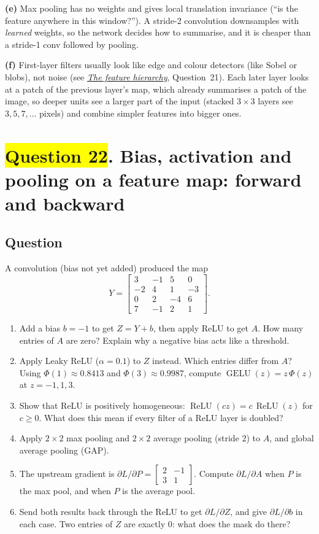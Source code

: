 \documentclass[12pt,a4paper]{article}
\newcommand{\seeconcept}[3]{(see \hyperref[#1]{\textit{#2}}, Question~#3)}
\newcommand{\relu}{\operatorname{ReLU}}
\newcommand{\hlq}[1]{{\setlength{\fboxsep}{1.5pt}\colorbox{yellow}{#1}}}
\begin{document}
\textbf{(e)} Max pooling has no weights and gives local translation invariance (``is the feature anywhere in this window?''). A stride-2 convolution downsamples with \emph{learned} weights, so the network decides how to summarise, and it is cheaper than a stride-1 conv followed by pooling.

\textbf{(f)} First-layer filters usually look like edge and colour detectors (like Sobel or blobs), not noise \seeconcept{c:hierarchy}{The feature hierarchy}{21}. Each later layer looks at a patch of the previous layer's map, which already summarises a patch of the image, so deeper units see a larger part of the input (stacked $3\times3$ layers see $3,5,7,\dots$ pixels) and combine simpler features into bigger ones.
\section[Question 22. Bias, activation and pooling on a feature map: forward and backward]{\hlq{Question 22}. Bias, activation and pooling on a feature map: forward and backward}
\subsection*{Question}
A convolution (bias not yet added) produced the map
\[
Y=\begin{bmatrix}3&-1&5&0\\-2&4&1&-3\\0&2&-4&6\\7&-1&2&1\end{bmatrix}.
\]
\begin{enumerate}[label=(\alph*)]
\item Add a bias $b=-1$ to get $Z=Y+b$, then apply ReLU to get $A$. How many entries of $A$ are zero? Explain why a negative bias acts like a threshold.
\item Apply Leaky ReLU ($\alpha=0.1$) to $Z$ instead. Which entries differ from $A$? Using $\Phi(1)\approx0.8413$ and $\Phi(3)\approx0.9987$, compute $\operatorname{GELU}(z)=z\,\Phi(z)$ at $z=-1,1,3$.
\item Show that ReLU is positively homogeneous: $\relu(cz)=c\,\relu(z)$ for $c\ge0$. What does this mean if every filter of a ReLU layer is doubled?
\item Apply $2\times2$ max pooling and $2\times2$ average pooling (stride 2) to $A$, and global average pooling (GAP).
\item The upstream gradient is $\partial L/\partial P=\begin{bmatrix}2&-1\\3&1\end{bmatrix}$. Compute $\partial L/\partial A$ when $P$ is the max pool, and when $P$ is the average pool.
\item Send both results back through the ReLU to get $\partial L/\partial Z$, and give $\partial L/\partial b$ in each case. Two entries of $Z$ are exactly 0: what does the mask do there?
\end{enumerate}
\end{document}
